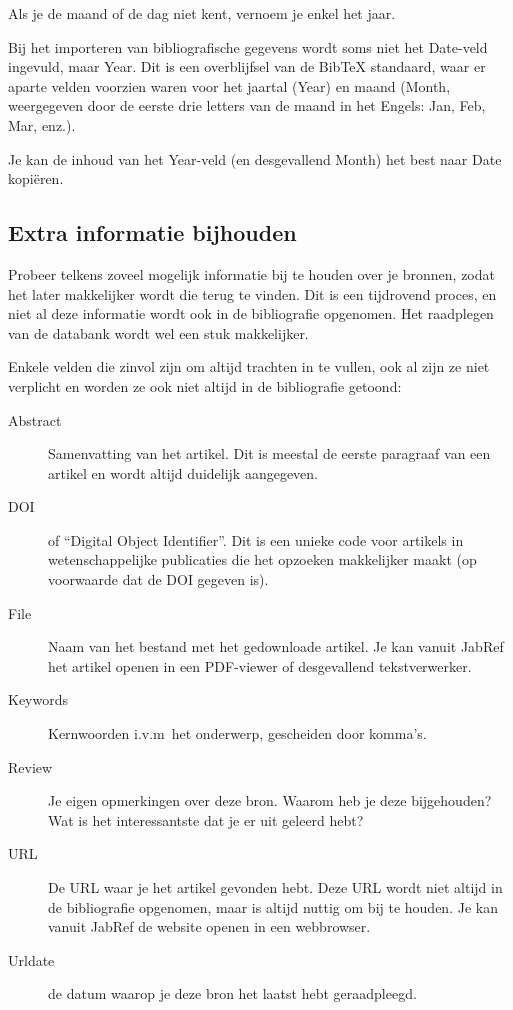 Als je de maand of de dag niet kent, vernoem je enkel het jaar.

Bij het importeren van bibliografische gegevens wordt soms niet het Date-veld ingevuld, maar Year. Dit is een overblijfsel van de Bib{\TeX} standaard, waar er aparte velden voorzien waren voor het jaartal (Year) en maand (Month, weergegeven door de eerste drie letters van de maand in het Engels: Jan, Feb, Mar, enz.).

Je kan de inhoud van het Year-veld (en desgevallend Month) het best naar Date kopiëren.

\subsection{Extra informatie bijhouden}%
\label{ssec:extra_informatie_bijhouden}

Probeer telkens zoveel mogelijk informatie bij te houden over je bronnen, zodat het later makkelijker wordt die terug te vinden. Dit is een tijdrovend proces, en niet al deze informatie wordt ook in de bibliografie opgenomen. Het raadplegen van de databank wordt wel een stuk makkelijker.

Enkele velden die zinvol zijn om altijd trachten in te vullen, ook al zijn ze niet verplicht en worden ze ook niet altijd in de bibliografie getoond:

\begin{description}
  \item[Abstract] Samenvatting van het artikel. Dit is meestal de eerste paragraaf van een artikel en wordt altijd duidelijk aangegeven.
  \item[DOI] of ``Digital Object Identifier''. Dit is een unieke code voor artikels in wetenschappelijke publicaties die het opzoeken makkelijker maakt (op voorwaarde dat de DOI gegeven is).
  \item[File] Naam van het bestand met het gedownloade artikel. Je kan vanuit JabRef het artikel openen in een PDF-viewer of desgevallend tekstverwerker.
  \item[Keywords] Kernwoorden i.v.m~het onderwerp, gescheiden door komma's.
  \item[Review] Je eigen opmerkingen over deze bron. Waarom heb je deze bijgehouden? Wat is het interessantste dat je er uit geleerd hebt?
  \item[URL] De URL waar je het artikel gevonden hebt. Deze URL wordt niet altijd in de bibliografie opgenomen, maar is altijd nuttig om bij te houden. Je kan vanuit JabRef de website openen in een webbrowser.
  \item[Urldate] de datum waarop je deze bron het laatst hebt geraadpleegd.
\end{description}

